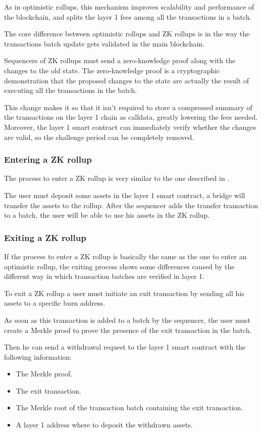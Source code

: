 \documentclass[12pt]{article}
\begin{document}
As in optimistic rollups, this mechanism improves scalability and performance of the blockchain, and splits the layer 1 fees among all the transactions in a batch.

The core difference between optimistic rollups and ZK rollups is in the way the transactions batch update gets validated in the main blockchain.

Sequencers of ZK rollups must send a zero-knowledge proof along with the changes to the old state. The zero-knowledge proof is a cryptographic demonstration that the proposed changes to the state are actually the result of executing all the transactions in the batch.

This change makes it so that it isn't required to store a compressed summary of the transactions on the layer 1 chain as calldata, greatly lowering the fees needed. Moreover, the layer 1 smart contract can immediately verify whether the changes are valid, so the challenge period can be completely removed.

\subsubsection{Entering a ZK rollup} \label{subsubsection:entering_zk_rollup}
The process to enter a ZK rollup is very similar to the one described in .

The user must deposit some assets in the layer 1 smart contract, a bridge will transfer the assets to the rollup. After the sequencer adds the transfer transaction to a batch, the user will be able to use his assets in the ZK rollup.

\subsubsection{Exiting a ZK rollup} \label{subsubsection:exiting_zk_rollup}
If the process to enter a ZK rollup is basically the same as the one to enter an optimistic rollup, the exiting process shows some differences caused by the different way in which transaction batches are verified in layer 1.

To exit a ZK rollup a user must initiate an exit transaction by sending all his assets to a specific burn address.

As soon as this transaction is added to a batch by the sequencer, the user must create a Merkle proof to prove the presence of the exit transaction in the batch.

Then he can send a withdrawal request to the layer 1 smart contract with the following information:
\begin{itemize}
    \item The Merkle proof.
    \item The exit transaction.
    \item The Merkle root of the transaction batch containing the exit transaction.
    \item A layer 1 address where to deposit the withdrawn assets.
\end{itemize}
\end{document}
